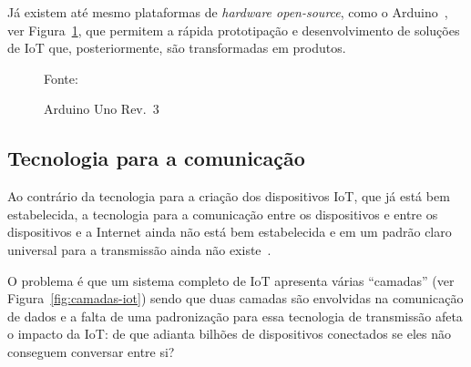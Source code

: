 \documentclass[pdftex, brazil, 12pt, twoside]{article}
\newcommand{\ingles}[1]{\textit{#1}}
\begin{document}
Já existem até mesmo plataformas de \ingles{hardware open-source}, como o
Arduino~\citep{McRobertsArduino2011,JavedArduinoIoT2016,SeneviratneIoTArduino2015,SchwartzESP8266IoT2016,BlumArduino2013,BoxallArduino2013,FitzgeraldShiloh2013}, ver Figura~\ref{fig:arduino-1}, que permitem a rápida prototipação e desenvolvimento de soluções
de IoT que, posteriormente, são transformadas em produtos.

\begin{figure}[!h]
  \begin{center}
    \caption{Arduino Uno Rev.\ 3}
    \label{fig:arduino-1}
    
    \footnotesize{Fonte:~\citet{FitzgeraldShiloh2013}}
  \end{center}
\end{figure}


\subsection{Tecnologia para a comunicação}
\label{tecnologia-iot-comunicacao}

Ao contrário da tecnologia para a criação dos dispositivos IoT, que já está
bem estabelecida, a tecnologia para a comunicação entre os dispositivos e
entre os dispositivos e a Internet ainda não está bem estabelecida e em um padrão
claro universal para a transmissão ainda não existe~\citep{NunesLoRaSigfox2017,AlsenMcKinseyIoT2017,LuetMcKinseyIoTPlatforms2017}.

O problema é que um sistema completo de IoT apresenta várias ``camadas''
(ver Figura~\ref{fig:camadas-iot}) sendo que duas camadas são envolvidas na comunicação de dados
e a falta de uma padronização para essa tecnologia de transmissão afeta o
impacto da IoT: de que adianta bilhões de dispositivos conectados se eles não
conseguem conversar entre si?
\end{document}
